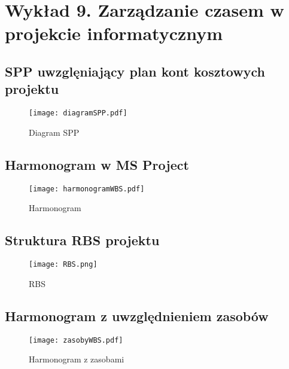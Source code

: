﻿\chapter{Wykład 9. Zarządzanie czasem w projekcie informatycznym}

\section{SPP uwzglęniający plan kont kosztowych projektu}

\begin{figure}[hbt]
\centering
\texttt{[image: diagramSPP.pdf]}
\caption{Diagram SPP}
\label{fig:diagramSPP}
\end{figure}


\section{Harmonogram w MS Project}

\begin{figure}[hbt]
\centering
\texttt{[image: harmonogramWBS.pdf]}
\caption{Harmonogram}
\label{fig:harmonogramWBS}
\end{figure}


\section{Struktura RBS projektu}

\begin{figure}[h]
\begin{center}
\texttt{[image: RBS.png]}
\caption[RBS]{RBS}
\label{rysunekProces}
\end{center}
\end{figure}


\section{Harmonogram z uwzględnieniem zasobów}

\begin{figure}[hbt]
\centering
\texttt{[image: zasobyWBS.pdf]}
\caption{Harmonogram z zasobami}
\label{fig:zasobyWBS}
\end{figure}


